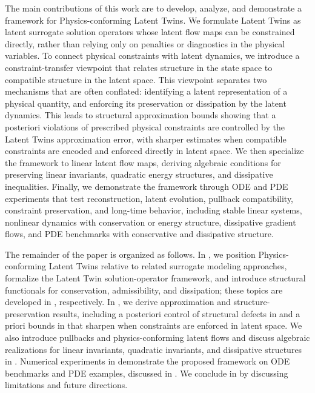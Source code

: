 \documentclass[a4paper,fleqn]{cas-sc}
\theoremstyle{thmstyleone}%
\theoremstyle{thmstyletwo}%
\theoremstyle{thmstylethree}%
\begin{document}
The main contributions of this work are to develop, analyze, and demonstrate a framework for Physics-conforming Latent Twins. We formulate Latent Twins as latent surrogate solution operators whose latent flow maps can be constrained directly, rather than relying only on penalties or diagnostics in the physical variables. To connect physical constraints with latent dynamics, we introduce a constraint-transfer viewpoint that relates structure in the state space to compatible structure in the latent space. This viewpoint separates two mechanisms that are often conflated: identifying a latent representation of a physical quantity, and enforcing its preservation or dissipation by the latent dynamics. This leads to structural approximation bounds showing that a posteriori violations of prescribed physical constraints are controlled by the Latent Twins approximation error, with sharper estimates when compatible constraints are encoded and enforced directly in latent space. We then specialize the framework to linear latent flow maps, deriving algebraic conditions for preserving linear invariants, quadratic energy structures, and dissipative inequalities. Finally, we demonstrate the framework through ODE and PDE experiments that test reconstruction, latent evolution, pullback compatibility, constraint preservation, and long-time behavior, including stable linear systems, nonlinear dynamics with conservation or energy structure, dissipative gradient flows, and PDE benchmarks with conservative and dissipative structure.

The remainder of the paper is organized as follows. In , we position Physics-conforming Latent Twins relative to related surrogate modeling approaches, formalize the Latent Twin solution-operator framework, and introduce structural functionals for conservation, admissibility, and dissipation; these topics are developed in , respectively. In , we derive approximation and structure-preservation results, including a posteriori control of structural defects in  and a priori bounds in  that sharpen when constraints are enforced in latent space. We also introduce pullbacks and physics-conforming latent flows and discuss algebraic realizations for linear invariants, quadratic invariants, and dissipative structures in . Numerical experiments in  demonstrate the proposed framework on ODE benchmarks and PDE examples, discussed in . We conclude in  by discussing limitations and future directions.
\end{document}
